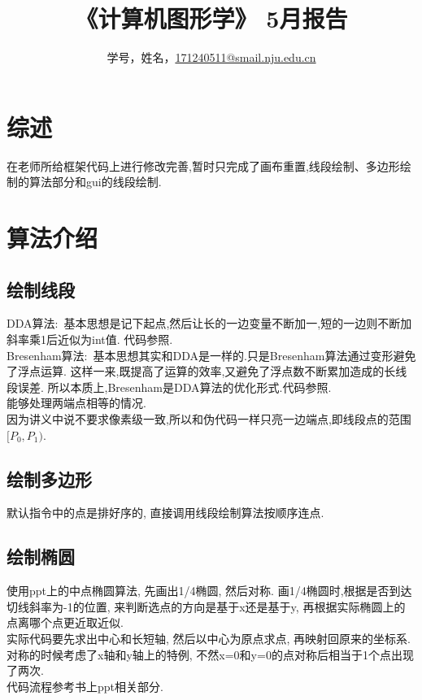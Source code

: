 \documentclass[a4paper,UTF8]{article}
\theoremstyle{definition}
\begin{document}
\title{\textbf{《计算机图形学》 5月报告 }}
\author{学号，姓名，\href{mailto:xxx@xxx.com}{171240511@smail.nju.edu.cn}}
\maketitle

\section{综述}
在老师所给框架代码上进行修改完善,暂时只完成了画布重置,线段绘制、多边形绘制的算法部分和gui的线段绘制.

\section{算法介绍}
\subsection{绘制线段}
\indent DDA算法:\ 基本思想是记下起点,然后让长的一边变量不断加一,短的一边则不断加斜率乘1后近似为int值.
代码参照\cite{rog_2002}.\\

\indent Bresenham算法:\ 基本思想其实和DDA是一样的.只是Bresenham算法通过变形避免了浮点运算.
这样一来,既提高了运算的效率,又避免了浮点数不断累加造成的长线段误差.
所以本质上,Bresenham是DDA算法的优化形式.代码参照\cite{rog_2002}.\\

\indent 能够处理两端点相等的情况.\\
\indent 因为讲义中说不要求像素级一致,所以和伪代码一样只亮一边端点,即线段点的范围$[P_0,P_1)$.

\subsection{绘制多边形}
默认指令中的点是排好序的, 直接调用线段绘制算法按顺序连点.

\subsection{绘制椭圆}
\indent 使用ppt上的中点椭圆算法, 先画出1/4椭圆, 然后对称. 画1/4椭圆时,根据是否到达切线斜率为-1的位置, 来判断选点的方向是基于x还是基于y, 再根据实际椭圆上的点离哪个点更近取近似.\\
\indent 实际代码要先求出中心和长短轴, 然后以中心为原点求点, 再映射回原来的坐标系.\\
\indent 对称的时候考虑了x轴和y轴上的特例, 不然x=0和y=0的点对称后相当于1个点出现了两次.\\
\indent 代码流程参考书上ppt相关部分.
\end{document}
